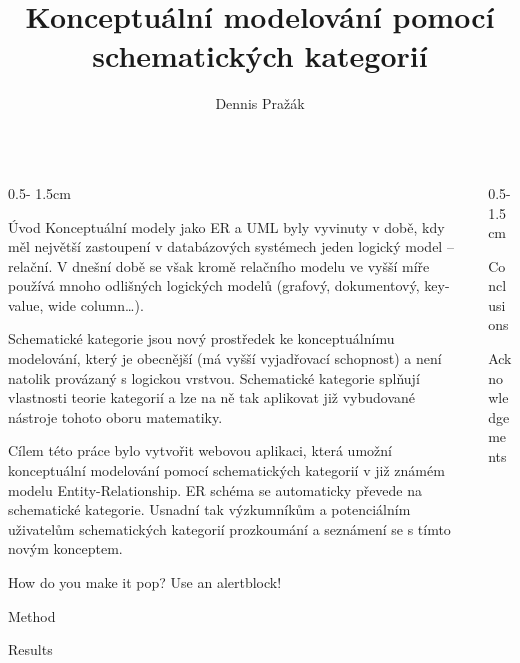 \documentclass[a0paper]{uioposter}
\title{Konceptuální modelování pomocí schematických kategorií}
\author {Dennis Pražák}
\begin{document}
\begin{frame}
\begin{columns}[onlytextwidth]


\begin{column}{0.5\textwidth - 1.5cm}
    \begin{block}{Úvod}
        Konceptuální modely jako ER a UML byly vyvinuty v době, kdy měl největší zastoupení v databázových systémech jeden logický model -- relační.
        V dnešní době se však kromě relačního modelu ve vyšší míře používá mnoho odlišných logických modelů (grafový, dokumentový, key-value, wide column\dots).

        \alert{Schematické kategorie} jsou nový prostředek ke konceptuálnímu modelování, který je obecnější (má vyšší vyjadřovací schopnost) a není natolik provázaný s logickou vrstvou.
        Schematické kategorie splňují vlastnosti teorie kategorií a lze na ně tak aplikovat již vybudované nástroje tohoto oboru matematiky.

        Cílem této práce bylo vytvořit webovou aplikaci, která umožní konceptuální modelování pomocí schematických kategorií v již známém modelu Entity-Relationship.
        ER schéma se automaticky převede na schematické kategorie.
        Usnadní tak výzkumníkům a potenciálním uživatelům schematických kategorií prozkoumání a seznámení se s tímto novým konceptem.
    \end{block}

    \begin{alertblock}{How do you make it pop?}
        Use an \alert{alertblock}!
    \end{alertblock}

    \begin{block}{Method}
        \lipsum[1]
    \end{block}

    \begin{block}{Results}
        \lipsum[2]
        \unskip
    \end{block}
\end{column}


\begin{column}{0.5\textwidth - 1.5cm}
    \begin{block}{Conclusions}
        \lipsum[4]
    \end{block}

    \begin{block}{Acknowledgements}
        \lipsum[5]
    \end{block}


\end{column}
\end{columns}
\end{frame}
\end{document}
